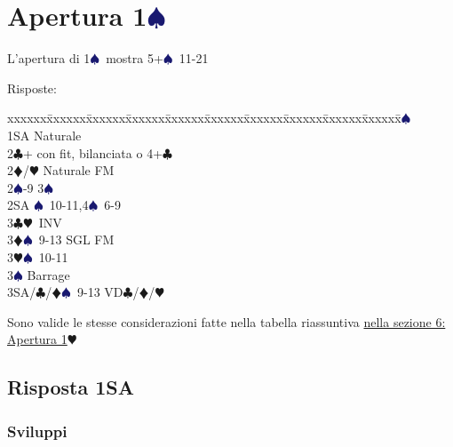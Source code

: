 \documentclass[a4paper,italian]{article}
\newcommand{\BC}{\textcolor{OliveGreen}{$\clubsuit$}}
\newcommand{\BD}{\textcolor{RedOrange}{$\vardiamondsuit$}}
\newcommand{\BH}{\textcolor{Red2}{$\varheartsuit${}}}
\newcommand{\BS}{\textcolor{MidnightBlue}{$\spadesuit${}}}
\newcommand{\pdfs}{\texorpdfstring{\BS{}}{S}}
\newenvironment{bidtable}
{\begin{tabbing}

    xxxxxx\=xxxxxx\=xxxxxx\=xxxxxx\=xxxxxx\=xxxxxx\=xxxxxx\=xxxxxx\=xxxxxx\=xxxxxx\=\kill}
{\end{tabbing} }%
\begin{document}
                                    \section{Apertura 1\pdfs}
                                    \begin{multicols}{2}
                                        L'apertura di 1\BS\ mostra 5+\BS\ 11-21

                                        Risposte:
                                        \begin{bidtable}
                                            1\BS\+\\
                                            1SA \>\> Naturale\\
                                            2\BC \>+ con fit, bilanciata o 4+\BC \\
                                            2\BD/\BH \>\> Naturale FM\\
                                            2\BS \>-9 3\BS \\
                                            2SA \>\BS\ 10-11,4\BS\ 6-9\\
                                            3\BC \>\BH\ INV\\
                                            3\BD \>\BS\ 9-13 SGL FM\\
                                            3\BH \>\BS\ 10-11\\
                                            3\BS \>\> Barrage\\
                                            3SA/\BC/\BD \>\BS\ 9-13 VD\BC /\BD /\BH \-
                                        \end{bidtable}

                                        Sono valide le stesse considerazioni fatte nella tabella riassuntiva \hyperref[1Maggiore]{nella sezione 6: Apertura 1\BH}
                                        \subsection{Risposta 1SA}

                                        \subsubsection{Sviluppi}


\end{multicols}
\end{document}
